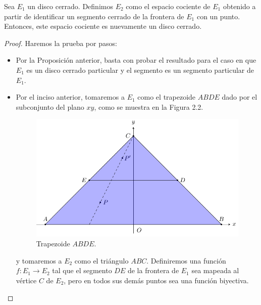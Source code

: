 \documentclass{article}
\newcounter{it}
\theoremstyle{largebreak}
\newcommand\cf[3]{\ensuremath{#1:#2\rightarrow#3}}
\begin{document}
    \begin{propo}
        \label{propC}
        Sea $E_1$ un disco cerrado. Definimos $E_2$ como el espacio cociente de $E_1$ obtenido a partir de identificar un segmento cerrado de la frontera de $E_1$ con un punto. Entonces, este espacio cociente es nuevamente un disco cerrado.
    \end{propo}

    \begin{proof}
        Haremos la prueba por pasos:
        \begin{itemize}
            \item Por la Proposición anterior, basta con probar el resultado para el caso en que $E_1$ es un disco cerrado particular y el segmento es un segmento particular de $E_1$.
            \item Por el inciso anterior, tomaremos a $E_1$ como el trapezoide $ABDE$ dado por el subconjunto del plano $xy$, como se muestra en la Figura 2.2.
            \begin{figure}
                \begin{center}
                    \includegraphics[scale=1]{images/fig_5.pdf}
                \end{center}
                \caption{Trapezoide $ABDE$.}
            \end{figure}
            y tomaremos a $E_2$ como el triángulo $ABC$. Definiremos una función $\cf{f}{E_1}{E_2}$ tal que el segmento $DE$ de la frontera de $E_1$ sea mapeada al vértice $C$ de $E_2$, pero en todos sus demás puntos sea una función biyectiva.


\end{itemize}
\end{proof}
\end{document}
